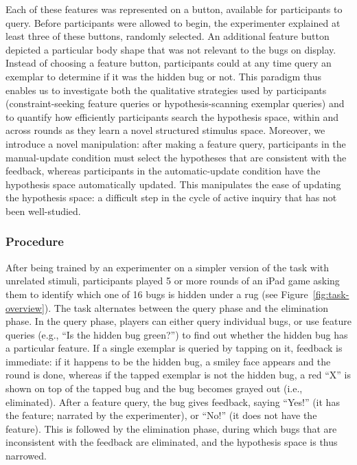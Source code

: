 \documentclass[man,floatsintext]{apa6}
\begin{document}
Each of these features was represented on a button, available for participants to query. Before 
participants were allowed to begin, the experimenter explained at least three of 
these buttons, randomly selected. An additional feature button depicted a particular 
body shape that was not relevant to the bugs on display. Instead of choosing a feature button, participants could at any time query an exemplar to determine if it was the hidden bug or not. This paradigm thus enables us to investigate both the qualitative strategies used by participants (constraint-seeking feature queries or hypothesis-scanning exemplar queries) and to quantify how efficiently participants search the hypothesis space, within and across rounds as they learn a novel structured stimulus space. Moreover, we introduce a novel manipulation: after making a feature query, participants in the manual-update condition must select the hypotheses that are consistent with the feedback, whereas participants in the automatic-update condition have the hypothesis space automatically updated. This manipulates the ease of updating the hypothesis space: a difficult step in the cycle of active inquiry that has not been well-studied. 

\subsubsection{Procedure}

After being trained by an experimenter on a simpler version of the task with 
unrelated stimuli, participants played 5 or more 
rounds of an iPad game asking them to identify which one of 16 bugs is hidden 
under a rug (see Figure~\ref{fig:task-overview}). The task alternates between the 
query phase and the elimination phase. In the query phase, players can either query 
individual bugs, or use feature queries (e.g., ``Is the hidden bug green?'') to find out 
whether the hidden bug has a particular feature. If a single exemplar is queried by 
tapping on it, feedback is immediate: if it happens to be the hidden bug, a smiley 
face appears and the round is done, whereas if the tapped exemplar is not the 
hidden bug, a red ``X'' is shown on top of the tapped bug and the bug becomes 
grayed out (i.e., eliminated). After a feature query, the bug gives feedback, saying 
``Yes!'' (it has the feature; narrated by the experimenter), or ``No!'' (it does not have 
the feature). This is followed by the elimination phase, during which bugs that are inconsistent 
with the feedback are eliminated, and the hypothesis space is thus narrowed. 
\end{document}
